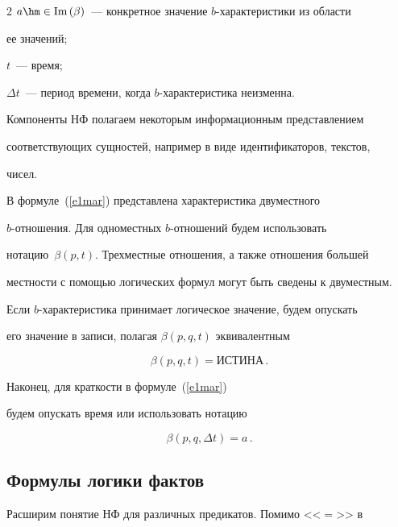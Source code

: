 \begin{multicols}{2}
  $a\hm\in  \mathrm{Im}\left(\beta\right)$~--- конкретное значение $b$-характеристики из области 


ее значений;


  $t$~--- время;


  $\Delta t$~--- период времени, когда $b$-характеристика неизменна.


  


  Компоненты НФ полагаем некоторым информационным представлением 


соответствующих сущностей, например в виде идентификаторов, текстов, 


чисел.


  


  В формуле~(\ref{e1mar}) представлена характеристика двуместного 


  $b$-от\-но\-ше\-ния. Для одноместных $b$-от\-но\-ше\-ний будем использовать 


нотацию~$\beta (p, t)$. Трехместные отношения, а также отношения большей 


местности с помощью логических формул могут быть сведены к двуместным.


  


  Если $b$-характеристика принимает логическое значение, будем опускать 


его значение в записи, полагая $\beta (p, q, t)$ эквивалентным 


$$\beta (p, q, t) = \mbox{ИСТИНА}\,.


$$ 





Наконец, для краткости в формуле~(\ref{e1mar}) 


будем опускать время или использовать нотацию 


$$


\beta (p, q, \Delta t) = a\,.


$$ 





\subsection{Формулы логики фактов}


  


  Расширим понятие НФ для различных предикатов. Помимо <<$=$>> в 



\end{multicols}
